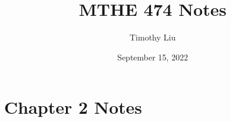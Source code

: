 \documentclass{article}
\begin{document}
\title{MTHE 474 Notes}
\author{Timothy Liu}
\date{September 15, 2022}
\maketitle
\newpage

\section*{Chapter 2 Notes}
\end{document}
